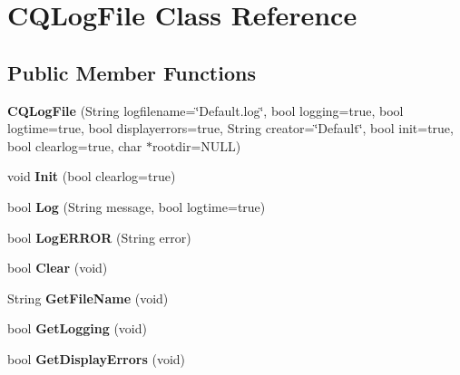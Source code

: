 \hypertarget{class_c_q_log_file}{
\section{CQLogFile Class Reference}
\label{class_c_q_log_file}
}
\subsection*{Public Member Functions}
\begin{DoxyCompactItemize}
\item 
\hypertarget{class_c_q_log_file_a9a0041202b7b584bd655834b8d2a1621}{
{\bfseries CQLogFile} (String logfilename=\char`\"{}Default.log\char`\"{}, bool logging=true, bool logtime=true, bool displayerrors=true, String creator=\char`\"{}Default\char`\"{}, bool init=true, bool clearlog=true, char $\ast$rootdir=NULL)}
\label{class_c_q_log_file_a9a0041202b7b584bd655834b8d2a1621}

\item 
\hypertarget{class_c_q_log_file_a0c891d799ab61afd3b8f4c278bcec10f}{
void {\bfseries Init} (bool clearlog=true)}
\label{class_c_q_log_file_a0c891d799ab61afd3b8f4c278bcec10f}

\item 
\hypertarget{class_c_q_log_file_a7ae4492dc1fec08c616b698fe7907428}{
bool {\bfseries Log} (String message, bool logtime=true)}
\label{class_c_q_log_file_a7ae4492dc1fec08c616b698fe7907428}

\item 
\hypertarget{class_c_q_log_file_a92723de49a3d2456c1e3746c1c588b02}{
bool {\bfseries LogERROR} (String error)}
\label{class_c_q_log_file_a92723de49a3d2456c1e3746c1c588b02}

\item 
\hypertarget{class_c_q_log_file_a7b886f55f51656ad224f30588f3fedf2}{
bool {\bfseries Clear} (void)}
\label{class_c_q_log_file_a7b886f55f51656ad224f30588f3fedf2}

\item 
\hypertarget{class_c_q_log_file_acb6d4974e06a022607e4467f3b544fd3}{
String {\bfseries GetFileName} (void)}
\label{class_c_q_log_file_acb6d4974e06a022607e4467f3b544fd3}

\item 
\hypertarget{class_c_q_log_file_aaf0625625a0865c276294d2ff280c7e2}{
bool {\bfseries GetLogging} (void)}
\label{class_c_q_log_file_aaf0625625a0865c276294d2ff280c7e2}

\item 
\hypertarget{class_c_q_log_file_ad1bd4a7459cc35b57b2b7107a71ae954}{
bool {\bfseries GetDisplayErrors} (void)}
\label{class_c_q_log_file_ad1bd4a7459cc35b57b2b7107a71ae954}

\end{DoxyCompactItemize}



